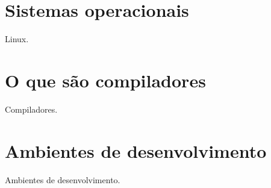 
\section{Sistemas operacionais}

Linux.


\section{O que são compiladores}

Compiladores.


\section{Ambientes de desenvolvimento}

Ambientes de desenvolvimento.



